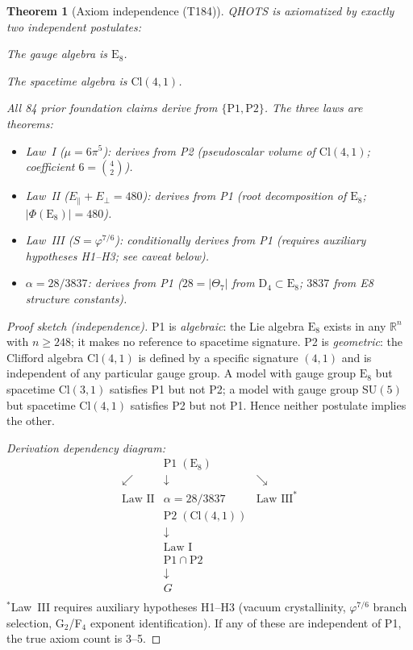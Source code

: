 \documentclass[aps,prd,twocolumn,superscriptaddress,floatfix,nofootinbib]{revtex4-2}
\newtheorem{theorem}{Theorem}
\theoremstyle{definition}
\theoremstyle{remark}
\newcommand{\vp}{\varphi}
\begin{document}
\begin{theorem}[Axiom independence (T184)]
\label{thm:axiom-independence}
QHOTS is axiomatized by exactly two independent postulates:
\begin{description}[nosep]
  \item[P1 (Algebraic)] The gauge algebra is $\mathrm{E}_8$.
  \item[P2 (Geometric)] The spacetime algebra is $\mathrm{Cl}(4,1)$.
\end{description}
All 84 prior foundation claims derive from $\{\mathrm{P1},\mathrm{P2}\}$.
The three laws are theorems:
\begin{itemize}[nosep]
  \item Law~I ($\mu = 6\pi^5$): derives from P2 (pseudoscalar volume of
    $\mathrm{Cl}(4,1)$; coefficient $6 = \binom{4}{2}$).
  \item Law~II ($E_\parallel + E_\perp = 480$): derives from P1
    (root decomposition of $\mathrm{E}_8$; $|\Phi(\mathrm{E}_8)| = 480$).
  \item Law~III ($S = \vp^{7/6}$): conditionally derives from P1
    (requires auxiliary hypotheses H1--H3; see caveat below).
  \item $\alpha = 28/3837$: derives from P1
    ($28 = |\Theta_7|$ from $\mathrm{D}_4 \subset \mathrm{E}_8$;
     $3837$ from E8 structure constants).
\end{itemize}
\end{theorem}

\begin{proof}[Proof sketch (independence)]
P1 is \emph{algebraic}: the Lie algebra $\mathrm{E}_8$ exists in any
$\mathbb{R}^n$ with $n \ge 248$; it makes no reference to spacetime
signature.  P2 is \emph{geometric}: the Clifford algebra
$\mathrm{Cl}(4,1)$ is defined by a specific signature $(4,1)$ and is
independent of any particular gauge group.  A model with gauge group
$\mathrm{E}_8$ but spacetime $\mathrm{Cl}(3,1)$ satisfies P1 but not P2;
a model with gauge group $\mathrm{SU}(5)$ but spacetime
$\mathrm{Cl}(4,1)$ satisfies P2 but not P1.  Hence neither postulate
implies the other.

\medskip\noindent
\textit{Derivation dependency diagram:}
\[
\begin{array}{ccc}
  & \mathrm{P1} \;(\mathrm{E}_8) & \\[4pt]
  \swarrow & \downarrow & \searrow \\[2pt]
  \text{Law II} & \alpha{=}28/3837 &
    \text{Law III}^* \\[6pt]
  & \mathrm{P2} \;(\mathrm{Cl}(4,1)) & \\[4pt]
  & \downarrow & \\[2pt]
  & \text{Law I} & \\[6pt]
  & \mathrm{P1} \cap \mathrm{P2} & \\[4pt]
  & \downarrow & \\[2pt]
  & G & \\
\end{array}
\]
$^*$Law~III requires auxiliary hypotheses H1--H3
(vacuum crystallinity, $\vp^{7/6}$ branch selection, G$_2$/F$_4$ exponent
identification).  If any of these are independent of P1, the true axiom
count is 3--5.
\end{proof}
\end{document}
